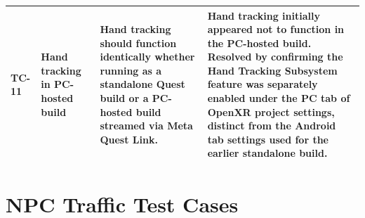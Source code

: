 {\begin{longtable}{|p{1.3cm}|p{3cm}|p{4.5cm}|p{4.5cm}|}
TC-11 & Hand tracking in PC-hosted build & Hand tracking should function identically whether running as a standalone Quest build or a PC-hosted build streamed via Meta Quest Link. & Hand tracking initially appeared not to function in the PC-hosted build. \textbf{Resolved} by confirming the Hand Tracking Subsystem feature was separately enabled under the PC tab of OpenXR project settings, distinct from the Android tab settings used for the earlier standalone build. \\ \hline

\end{longtable}}

\section{NPC Traffic Test Cases}

